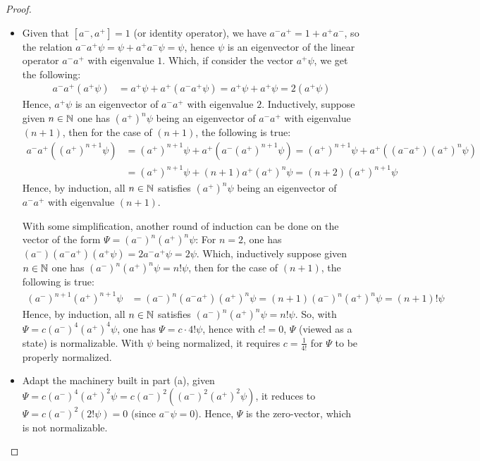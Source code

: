 \documentclass{article}
\begin{document}
\begin{proof}

    \hfil

    \begin{itemize}
        \item[(a)] Given that $[a^-, a^+]=1$ (or identity operator), we have $a^-a^+=1+a^+a^-$, so the relation $a^-a^+\psi=\psi+a^+a^-\psi = \psi$, hence $\psi$ is an eigenvector of the linear operator $a^-a^+$ with eigenvalue $1$. Which, if consider the vector $a^+\psi$, we get the following:
        \begin{align}
            a^-a^+(a^+\psi) &= a^+\psi+a^+(a^-a^+\psi) = a^+\psi + a^+\psi=2(a^+\psi)
        \end{align}
        Hence, $a^+\psi$ is an eigenvector of $a^-a^+$ with eigenvalue $2$. Inductively, suppose given $n\in\mathbb{N}$ one has $(a^+)^n\psi$ being an eigenvector of $a^-a^+$ with eigenvalue $(n+1)$, then for the case of $(n+1)$, the following is true:
        \begin{align}
            a^-a^+((a^+)^{n+1}\psi) &= (a^+)^{n+1}\psi+a^+(a^-(a^+)^{n+1}\psi)=(a^+)^{n+1}\psi+a^+((a^-a^+)(a^+)^{n}\psi)\\
            &= (a^+)^{n+1}\psi+(n+1) a^+(a^+)^{n}\psi = (n+2)(a^+)^{n+1}\psi
        \end{align}
        Hence, by induction, all $n\in\mathbb{N}$ satisfies $(a^+)^n\psi$ being an eigenvector of $a^-a^+$ with eigenvalue $(n+1)$.

        With some simplification, another round of induction can be done on the vector of the form $\Psi=(a^-)^n(a^+)^n\psi$: For $n=2$, one has $(a^-)(a^-a^+)(a^+\psi) = 2a^-a^+\psi = 2\psi$. Which, inductively suppose given $n\in\mathbb{N}$ one has $(a^-)^n(a^+)^n\psi=n!\psi$, then for the case of $(n+1)$, the following is true:
        \begin{align}
            (a^-)^{n+1}(a^+)^{n+1}\psi &= (a^-)^n (a^-a^+)(a^+)^n\psi = (n+1)(a^-)^n(a^+)^n \psi = (n+1)!\psi
        \end{align}
        Hence, by induction, all $n\in\mathbb{N}$ satisfies $(a^-)^n(a^+)^n\psi = n!\psi$. So, with $\Psi = c(a^-)^4(a^+)^4\psi$, one has $\Psi = c\cdot 4!\psi$, hence with $c!=0$, $\Psi$ (viewed as a state) is normalizable. With $\psi$ being normalized, it requires $c=\frac{1}{4!}$ for $\Psi$ to be properly normalized.

        \hfil

        \item[(b)] Adapt the machinery built in part (a), given $\Psi=c(a^-)^4(a^+)^2\psi = c(a^-)^2((a^-)^2(a^+)^2\psi)$, it reduces to $\Psi = c(a^-)^2(2!\psi) = 0$ (since $a^-\psi=0$). Hence, $\Psi$ is the zero-vector, which is not normalizable.
    \end{itemize}

\end{proof}
\end{document}
